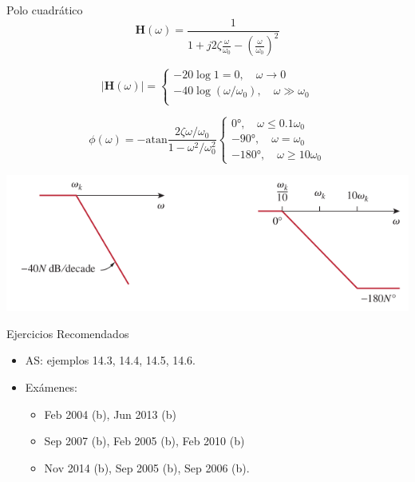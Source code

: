 \documentclass[xcolor={usenames,svgnames,dvipsnames}]{beamer}
\newcommand{\fasor}[1]{\mathbf{#1}(\omega)}
\newcommand{\atan}{\mathrm{atan}}
\begin{document}
\begin{frame}[label={sec:org0720aa2}]{Polo cuadrático}
\[
  \fasor{H} = \frac{1}{1 + j 2 \zeta \frac{\omega}{\omega_0} - \left(\frac{\omega}{\omega_0}\right)^2} 
\]


\[
  |\fasor{H}| = 
  \begin{cases}
  - 20 \log 1 = 0, \quad \omega \to 0\\
  - 40 \log (\omega/\omega_0), \quad \omega \gg \omega_0\\
  \end{cases}
\]

\[
  \phi(\omega) = - \atan \frac{2\zeta\omega/\omega_0}{1 - \omega^2/\omega_0^2}
  \begin{cases}
    \ang{0},\quad \omega \leq 0.1\omega_0\\
    - \ang{90}, \quad \omega = \omega_0\\
    - \ang{180}, \quad \omega \geq 10 \omega_0
  \end{cases}
\]



\begin{center}
\includegraphics[width=.9\linewidth]{figs/BodePoloCuadratico.pdf}
\end{center}
\end{frame}

\begin{frame}[label={sec:orgb29760a}]{Ejercicios Recomendados}
\begin{itemize}
\item AS: ejemplos 14.3, 14.4, 14.5, 14.6.
\item Exámenes:
\begin{itemize}
\item Feb 2004 (b), Jun 2013 (b)
\item Sep 2007 (b), Feb 2005 (b), Feb 2010 (b)
\item Nov 2014 (b), Sep 2005 (b), Sep 2006 (b).
\end{itemize}
\end{itemize}
\end{frame}
\end{document}
